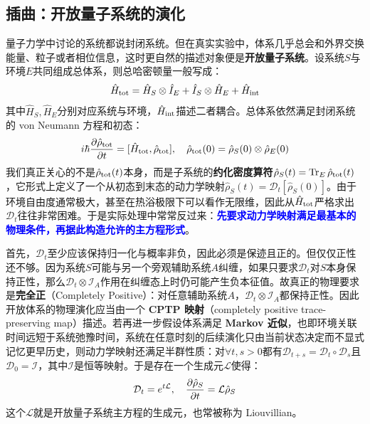 \newpage
\subsection{插曲：开放量子系统的演化}
量子力学中讨论的系统都说封闭系统。但在真实实验中，体系几乎总会和外界交换能量、粒子或者相位信息，这时更自然的描述对象便是\textbf{开放量子系统}。设系统$S$与环境$E$共同组成总体系，则总哈密顿量一般写成：
\[\hat{H}_{\rm tot}=\hat{H}_S\otimes \hat{I}_E+\hat{I}_S\otimes \hat{H}_E+\hat{H}_{\rm int}\]
其中$\hat{H}_S,\hat{H}_E$分别对应系统与环境，$\hat{H}_{\rm int}$描述二者耦合。总体系依然满足封闭系统的 von Neumann 方程和初态：
\[i\hbar\pdv{\hat{\rho}_{\rm tot}}{t}=[\hat{H}_{\rm tot},\hat{\rho}_{\rm tot}], \quad \hat{\rho}_{\rm tot}(0)=\hat{\rho}_S(0)\otimes \hat{\rho}_E(0)\]
我们真正关心的不是$\hat{\rho}_{\rm tot}(t)$本身，而是子系统的\textbf{约化密度算符}$\hat{\rho}_S(t)=\Tr_E \hat{\rho}_{\rm tot}(t)$，它形式上定义了一个从初态到末态的动力学映射$\hat{\rho}_S(t)=\mathcal{D}_t[\hat{\rho}_S(0)]$。由于环境自由度通常极大，甚至在热浴极限下可以看作无限维，因此从$\hat{H}_{\rm tot}$严格求出$\mathcal{D}_t$往往非常困难。于是实际处理中常常反过来：\textcolor{blue}{\textbf{先要求动力学映射满足最基本的物理条件，再据此构造允许的主方程形式}}。

首先，$\mathcal{D}_t$至少应该保持归一化与概率非负，因此必须是保迹且正的。但仅仅正性还不够。因为系统$S$可能与另一个旁观辅助系统$A$纠缠，如果只要求$\mathcal{D}_t$对$S$本身保持正性，那么$\mathcal{D}_t\otimes \mathcal{I}_A$作用在纠缠态上时仍可能产生负本征值。故真正的物理要求是\textbf{完全正}（Completely Positive）：对任意辅助系统$A$，$\mathcal{D}_t\otimes \mathcal{I}_A$都保持正性。因此开放体系的物理演化应当由一个 \textbf{CPTP 映射}（completely positive trace-preserving map）描述。若再进一步假设体系满足 \textbf{Markov 近似}，也即环境关联时间远短于系统弛豫时间，系统在任意时刻的后续演化只由当前状态决定而不显式记忆更早历史，则动力学映射还满足半群性质：对$\forall t,s>0$都有$\mathcal{D}_{t+s}=\mathcal{D}_t\circ \mathcal{D}_s$且$\mathcal{D}_0=\mathcal{I}$，其中$\mathcal{I}$是恒等映射。于是存在一个生成元$\mathcal{L}$使得：
\[\mathcal{D}_t=e^{t\mathcal{L}},\quad \pdv{\hat{\rho}_S}{t}=\mathcal{L}\hat{\rho}_S\]
这个$\mathcal{L}$就是开放量子系统主方程的生成元，也常被称为 Liouvillian。


